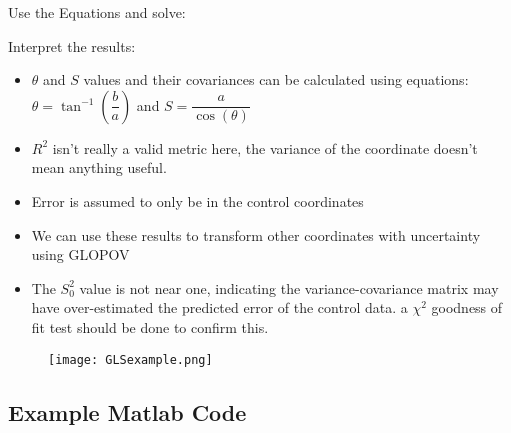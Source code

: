 Use the Equations and solve:

Interpret the results:
\begin{itemize}
	\item $\theta$ and $S$ values and their covariances can be calculated using equations: $\theta = \tan^{-1}(\dfrac{b}{a})$ and $S = \dfrac{a}{\cos(\theta)}$
	\item $R^2$ isn't really a valid metric here, the variance of the coordinate doesn't mean anything useful.
	\item Error is assumed to only be in the control coordinates
	\item We can use these results to transform other coordinates with uncertainty using GLOPOV
	\item The $S_0^2$ value is not near one, indicating the variance-covariance matrix may have over-estimated the predicted error of the control data. a $\chi^2$ goodness of fit test should be done to confirm this.  
\end{itemize}
\begin{figure}[H]
	\centering
	\texttt{[image: GLSexample.png]}
\end{figure}
\clearpage
\subsection{Example Matlab Code}




